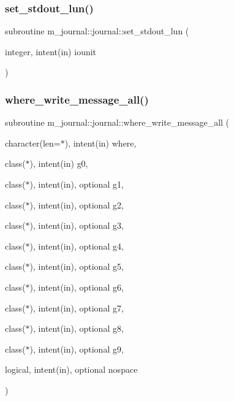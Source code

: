\mbox{\label{interfacem__journal_1_1journal_a78f9c4a4314847963a2feae798ff54c1}} 
\subsubsection{\texorpdfstring{set\+\_\+stdout\+\_\+lun()}{set\_stdout\_lun()}}
{\footnotesize\ttfamily subroutine m\+\_\+journal\+::journal\+::set\+\_\+stdout\+\_\+lun (\begin{DoxyParamCaption}\item[{integer, intent(in)}]{iounit }\end{DoxyParamCaption})\hspace{0.3cm}{\ttfamily [private]}}

\mbox{\label{interfacem__journal_1_1journal_ae6136e918d4383d1c463c536a3eb814a}} 
\subsubsection{\texorpdfstring{where\+\_\+write\+\_\+message\+\_\+all()}{where\_write\_message\_all()}}
{\footnotesize\ttfamily subroutine m\+\_\+journal\+::journal\+::where\+\_\+write\+\_\+message\+\_\+all (\begin{DoxyParamCaption}\item[{character(len=$\ast$), intent(in)}]{where,  }\item[{class($\ast$), intent(in)}]{g0,  }\item[{class($\ast$), intent(in), optional}]{g1,  }\item[{class($\ast$), intent(in), optional}]{g2,  }\item[{class($\ast$), intent(in), optional}]{g3,  }\item[{class($\ast$), intent(in), optional}]{g4,  }\item[{class($\ast$), intent(in), optional}]{g5,  }\item[{class($\ast$), intent(in), optional}]{g6,  }\item[{class($\ast$), intent(in), optional}]{g7,  }\item[{class($\ast$), intent(in), optional}]{g8,  }\item[{class($\ast$), intent(in), optional}]{g9,  }\item[{logical, intent(in), optional}]{nospace }\end{DoxyParamCaption})\hspace{0.3cm}{\ttfamily [private]}}



